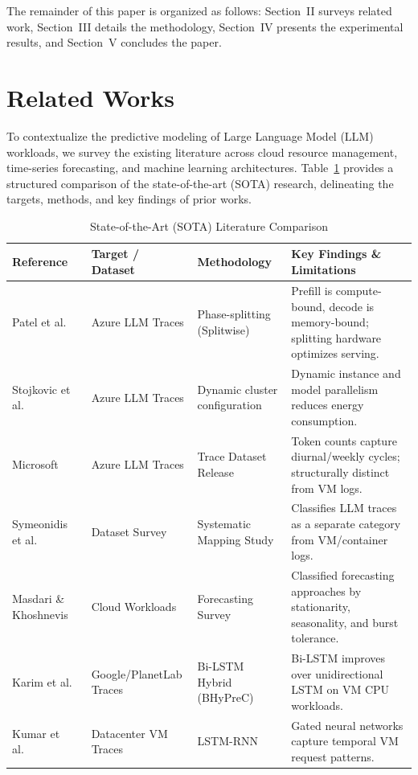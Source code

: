\documentclass[conference, a4paper]{IEEEtran}
\begin{document}
The remainder of this paper is organized as follows: Section~II surveys related work, Section~III details the methodology, Section~IV presents the experimental results, and Section~V concludes the paper.
\section{Related Works}

To contextualize the predictive modeling of Large Language Model (LLM) workloads, we survey the existing literature across cloud resource management, time-series forecasting, and machine learning architectures. Table~\ref{tab:sota} provides a structured comparison of the state-of-the-art (SOTA) research, delineating the targets, methods, and key findings of prior works.

\begin{table}[htbp]
\caption{State-of-the-Art (SOTA) Literature Comparison}
\label{tab:sota}
\centering
\renewcommand{\arraystretch}{0.88}
\begin{tabular}{lp{4cm}p{4cm}p{6.5cm}}
\hline
\textbf{Reference} & \textbf{Target / Dataset} & \textbf{Methodology} & \textbf{Key Findings \& Limitations} \\ \hline
Patel et al.~\cite{patel2024splitwise} & Azure LLM Traces & Phase-splitting (Splitwise) & Prefill is compute-bound, decode is memory-bound; splitting hardware optimizes serving. \\
Stojkovic et al.~\cite{stojkovic2025dynamollm} & Azure LLM Traces & Dynamic cluster configuration & Dynamic instance and model parallelism reduces energy consumption. \\
Microsoft~\cite{azurellm2024} & Azure LLM Traces & Trace Dataset Release & Token counts capture diurnal/weekly cycles; structurally distinct from VM logs. \\
Symeonidis et al.~\cite{symeonidis2025datasets} & Dataset Survey & Systematic Mapping Study & Classifies LLM traces as a separate category from VM/container logs. \\
Masdari \& Khoshnevis~\cite{masdari2020survey} & Cloud Workloads & Forecasting Survey & Classified forecasting approaches by stationarity, seasonality, and burst tolerance. \\
Karim et al.~\cite{karim2021bhyprec} & Google/PlanetLab Traces & Bi-LSTM Hybrid (BHyPreC) & Bi-LSTM improves over unidirectional LSTM on VM CPU workloads. \\
Kumar et al.~\cite{kumar2018lstmrnn} & Datacenter VM Traces & LSTM-RNN & Gated neural networks capture temporal VM request patterns. \\

\end{tabular}
\end{table}
\end{document}
